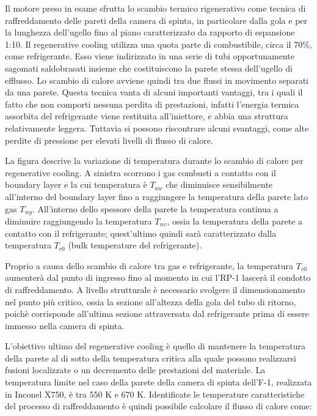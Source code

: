 Il motore preso in esame sfrutta lo scambio termico rigenerativo come tecnica di raffreddamento delle pareti della camera di spinta, in particolare dalla gola e per la lunghezza dell'ugello fino al piano caratterizzato da rapporto di espansione 1:10. Il regenerative cooling utilizza una quota parte di combustibile, circa il 70\%, come refrigerante. Esso viene indirizzato in una serie di tubi opportunamente sagomati saldobrasati insieme che costituiscono la parete stessa dell'ugello di efflusso. Lo scambio di calore avviene quindi tra due flussi in movimento separati da una parete.
Questa tecnica vanta di alcuni importanti vantaggi, tra i quali il fatto che non comporti nessuna perdita di prestazioni, infatti l'energia termica assorbita del refrigerante viene restituita all'iniettore, e abbia una struttura relativamente leggera. Tuttavia si possono riscontrare alcuni svantaggi, come alte perdite di pressione per elevati livelli di flusso di calore.


La figura descrive la variazione di temperatura durante lo scambio di calore per regenerative cooling. A sinistra scorrono i gas combusti a contatto con il boundary layer e la cui temperatura è $T_{aw}$ che diminuisce sensibilmente all'interno del boundary layer fino a raggiungere la temperatura della parete lato gas $T_{wg}$. All'interno dello spessore della parete la temperatura continua a diminuire raggiungendo la temperatura $T_{wc}$, ossia la temperatura della parete a contatto con il refrigerante; quest'ultimo quindi sarà caratterizzato dalla temperatura $T_{c0}$ (bulk temperature del refrigerante).

Proprio a causa dello scambio di calore tra gas e refrigerante, la temperatura $T_{c0}$ aumenterà dal punto di ingresso fino al momento in cui l'RP-1 lascerà il condotto di raffreddamento. A livello strutturale è necessario svolgere il dimensionamento nel punto più critico, ossia la sezione all'altezza della gola del tubo di ritorno, poichè corrisponde all'ultima sezione attraversata dal refrigerante prima di essere immesso nella camera di spinta.

L'obiettivo ultimo del regenerative cooling è quello di mantenere la temperatura della parete al di sotto della temperatura critica alla quale possono realizzarsi fusioni localizzate o un decremento delle prestazioni del materiale. La temperatura limite nel caso della parete della camera di spinta dell'F-1, realizzata in Inconel X750, è tra 550 K e 670 K.
Identificate le temperature caratteristiche del processo di raffreddamento è quindi possibile calcolare il flusso di calore come:

